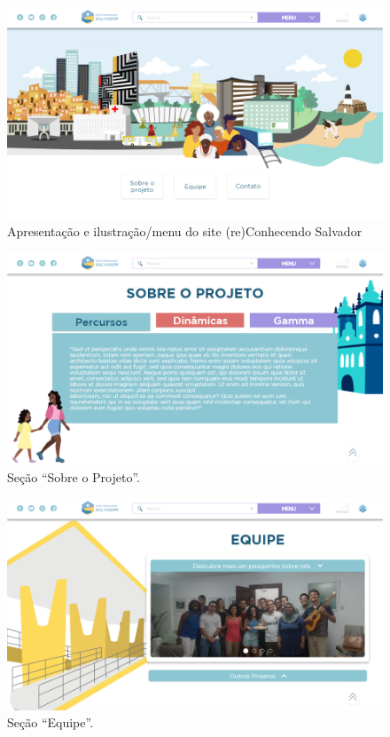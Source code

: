 \documentclass[
]{book}
\begin{document}
\begin{figure}
\includegraphics[width=13.33in]{images/image29} \caption{Apresentação e ilustração/menu do site (re)Conhecendo Salvador}\label{fig:ilustrecossa}
\end{figure}

\begin{figure}
\includegraphics[width=13.33in]{images/image7} \caption{Seção “Sobre o Projeto”.}\label{fig:sobrerecossa}
\end{figure}

\begin{figure}
\includegraphics[width=13.33in]{images/image23} \caption{Seção “Equipe”.}\label{fig:equiperecossa}
\end{figure}
\end{document}
